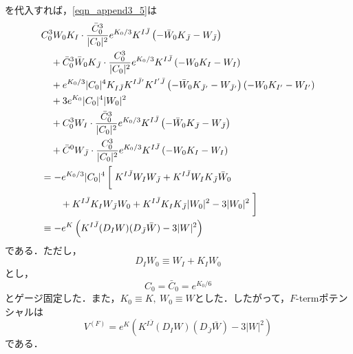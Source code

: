 \documentclass[a4paper,uplatex,dvipdfmx,10pt]{jsarticle}
\theoremstyle{definition}
\begin{document}
を代入すれば，\eqref{eqn_append3_5}は
\begin{align}
&
C_{0}^{3}
W_{0}K_{I}
\cdot
    \frac{\bar{C}_{0}^{3}}{|C_{0}|^2}e^{K_{0}/3}K^{I\bar{J}}
    \left(
        -
        \bar{W}_{0}K_{\bar{J}}
        -
        W_{\bar{J}}
    \right)
\nonumber
\\
&\quad
+\bar{C}_{0}^{3}\bar{W}_{0}K_{\bar{J}}
\cdot
    \frac{C_{0}^{3}}{|C_{0}|^{2}}e^{K_{0}/3}K^{I\bar{J}}
    \left(
        -
        W_{0}K_{I}
        -
        W_{I}
    \right)
\nonumber
\\
&\quad
+
e^{K_{0}/3}|C_{0}|^{4}K_{I\bar{J}}K^{I\bar{J^{\prime}}}K^{I^{\prime}\bar{J}}
    \left(
        -
        \bar{W}_{0}K_{\bar{J^{\prime}}}
        -
        W_{\bar{J^{\prime}}}
    \right)
    \left(
        -
        W_{0}K_{I^{\prime}}
        -
        W_{I^{\prime}}
    \right)
\nonumber   
\\
&\quad
+
3
e^{K_{0}}|C_{0}|^{4}|W_{0}|^2
\nonumber   
\\
&\quad
+
C_{0}^{3}W_{I}
\cdot
    \frac{\bar{C}_{0}^{3}}{|C_{0}|^2}e^{K_{0}/3}K^{I\bar{J}}
    \left(
        -
        \bar{W}_{0}K_{\bar{J}}
        -
        W_{\bar{J}}
    \right)
\nonumber
\\
&\quad
+
\bar{C}^{0}W_{\bar{J}}
\cdot
    \frac{C_{0}^{3}}{|C_{0}|^{2}}e^{K_{0}/3}K^{I\bar{J}}
    \left(
        -
        W_{0}K_{I}
        -
        W_{I}
    \right)
\nonumber   
\\
&=
-
e^{K_{0}/3}|C_{0}|^{4}\left[\vphantom{\dfrac{1}{2}}\right.
    K^{I\bar{J}}W_{I}W_{\bar{J}}
    +
    K^{I\bar{J}}W_{I}K_{\bar{J}}\bar{W}_{0}
\nonumber
\\
&\qquad
+
K^{I\bar{J}}K_{I}W_{\bar{J}}W_{0}
+
K^{I\bar{J}}K_{I}K_{\bar{J}}|W_{0}|^2
-
3|W_{0}|^2
\left.\vphantom{\dfrac{1}{2}}\right]
\nonumber
\\
&\equiv
-
e^{K}
\left(
    K^{I\bar{J}}
    (D_{I}W)(D_{\bar{J}}\bar{W})
    -
    3|W|^2
\right)    
\nonumber   
\end{align}
である．ただし，
\begin{equation}
   D_{I}W_{0}
   \equiv
   W_{I}
   +
   K_{I}W_{0}
   \nonumber
\end{equation}
とし，
\begin{equation}
   C_{0}
   =
   \bar{C}_{0}
   =
   e^{K_{0}/6}
   \nonumber
\end{equation}
とゲージ固定した．また，$K_{0}\equiv K,\ W_{0}\equiv W$とした．したがって，$F$-termポテンシャルは
\begin{equation}
   V^{(F)}
   =
   e^{K}
   \left(
       K^{I\bar{J}}
       (D_{I}W)(D_{\bar{J}}\bar{W})
       -
       3|W|^2
   \right)    
\end{equation}
である．


\clearpage



\nocite{柴崎_背景_2021}
\nocite{中野_磁化_2023}
\end{document}
